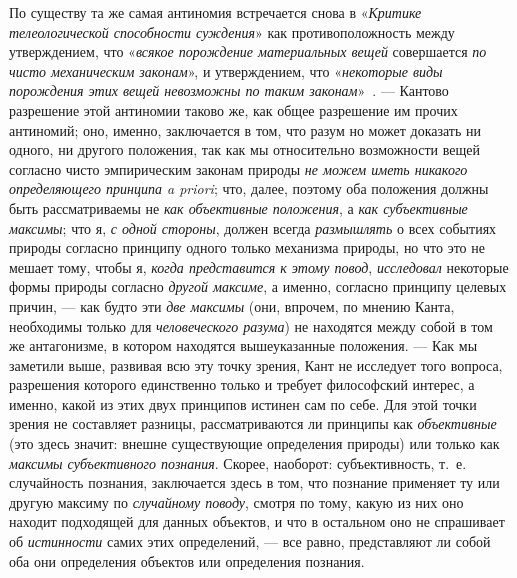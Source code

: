 \documentclass[twoside]{article}
\begin{document}
{{{{По существу та же самая антиномия встречается снова в
«{\em Критике телеологической
способности суждения}» как противоположность между
утверждением, что «{\em всякое
порождение материальных вещей} совершается
{\em по чисто механическим законам}»,
и утверждением, что
«{\em некоторые виды порождения этих
вещей невозможны по таким
законам}»~\label{bkm:bm85}.
— Кантово разрешение этой антиномии таково же, как общее
разрешение им прочих антиномий; оно, именно, заключается в том, что разум
но может доказать ни одного, ни другого положения, так как мы относительно
возможности вещей согласно чисто эмпирическим законам природы
{\em не можем иметь никакого
определяющего принципа a priori}; что, далее, поэтому оба
положения должны быть рассматриваемы не
{\em как объективные положения},
а {\em как субъективные
максимы}; что я, {\em с
одной стороны}, должен всегда
{\em размышлять} о всех
событиях природы согласно принципу одного только механизма природы, но что
это не мешает тому, чтобы я, {\em когда
представится к этому повод},
{\em исследовал} некоторые
формы природы согласно {\em другой
максиме}, а именно, согласно принципу целевых причин, —
как будто эти {\em две
максимы} (они, впрочем, по мнению Канта, необходимы только
для {\em человеческого разума})
не находятся между собой в том же антагонизме, в котором
находятся вышеуказанные положения. — Как мы заметили выше,
развивая всю эту точку зрения, Кант не исследует того вопроса, разрешения
которого единственно только и требует философский интерес, а именно, какой
из этих двух принципов истинен сам по себе. Для этой точки зрения не
составляет разницы, рассматриваются ли принципы как
{\em объективные} (это
здесь значит: внешне существующие определения природы) или только как
{\em максимы субъективного познания}.
Скорее, наоборот: субъективность, т.~е. случайность познания,
заключается здесь в том, что познание применяет ту или другую максиму по
{\em случайному поводу},
смотря по тому, какую из них оно находит подходящей для
данных объектов, и что в остальном оно не спрашивает об
{\em истинности} самих
этих определений, — все равно, представляют ли собой оба они
определения объектов или определения познания.

}}}}
\end{document}
